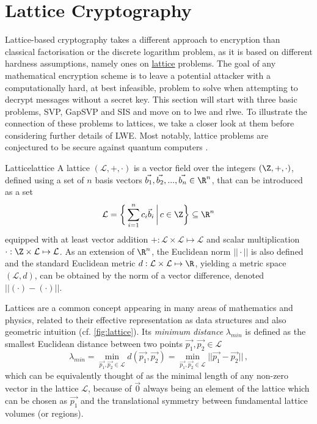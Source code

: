 \section{Lattice Cryptography}
\label{subsec:lattice-crypto}
Lattice-based cryptography takes a different approach to encryption than classical factorisation or the discrete logarithm problem, as it is based on different hardness assumptions, namely ones on \hyperref[def:lattice]{lattice} problems.
The goal of any mathematical encryption scheme is to leave a potential attacker with a computationally hard, at best infeasible, problem to solve when attempting to decrypt messages without a secret key.
This section will start with three basic problems, SVP, GapSVP and SIS and move on to \gls{lwe} and \gls{rlwe}.
To illustrate the connection of these problems to lattices, we take a closer look at them before considering further details of LWE.
Most notably, lattice problems are conjectured to be secure against quantum computers \parencite{2018-lattice-problems}.

\newcommand{\lat}{\mathcal{L}}
\begin{definition}{Lattice}{lattice}
  A lattice $(\lat, +, \cdot)$ is a vector field over the integers $(\Z, +, \cdot)$, defined using a set of $n$ basis vectors $\vec{b_1}, \vec{b_2}, ..., \vec{b_n} \in \R^n$, that can be introduced as a set
  $$\lat = \bigg\{\sum_{i=1}^n c_i \vec{b}_i \,\bigg|\, c \in \Z\bigg\} \subseteq \R^n$$
  equipped with at least vector addition $+: \lat \times \lat \mapsto \lat$ and scalar multiplication $\cdot: \Z \times \lat \mapsto \lat$.
  As an extension of $\R^n$, the Euclidean norm $||\cdot||$ is also defined and the standard Euclidean metric $d: \lat \times \lat \mapsto \R$, yielding a metric space $(\lat, d)$, can be obtained by the norm of a vector difference, denoted $||(\cdot) - (\cdot)||$.
\end{definition}

Lattices are a common concept appearing in many areas of mathematics and physics, related to their effective representation as data structures and also geometric intuition (cf. \cref{fig:lattice}).
Its \textit{minimum distance} $\lambda_{min}$ is defined as the smallest Euclidean distance between two points $\vec{p_1}, \vec{p_2} \in \lat$
$$\lambda_{min} = \min_{\vec{p_1}, \vec{p_2} \in \lat} d(\vec{p_1}, \vec{p_2}) =
  \min_{\vec{p_1}, \vec{p_2} \in \lat} ||\vec{p_1} - \vec{p_2}|| \,,$$
which can be equivalently thought of as the minimal length of any non-zero vector in the lattice $\lat$, because of $\vec{0}$ always being an element of the lattice which can be chosen as $\vec{p_1}$ and the translational symmetry between fundamental lattice volumes (or regions).

